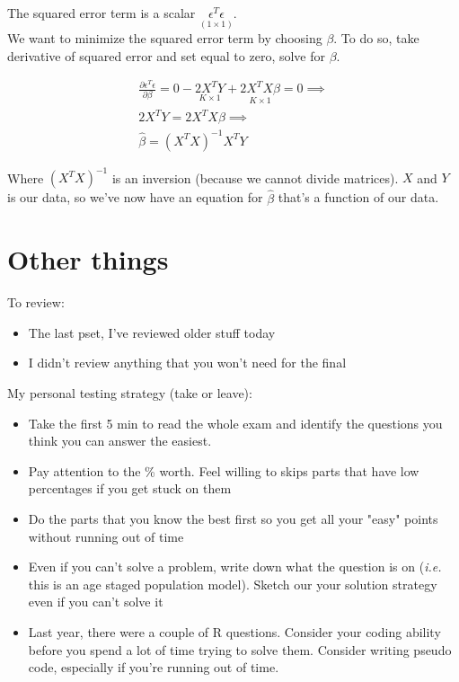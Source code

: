 \documentclass{article}
\begin{document}
The squared error term is a scalar $\underset{(1 \times 1)}{\epsilon^T \epsilon}$. \\

We want to minimize the squared error term by choosing $\beta$. To do so, take derivative of squared error and set equal to zero, solve for $\beta$. 

\begin{align}
    \frac{\partial \epsilon^T  \epsilon }{ \partial \beta} = 0 - \underset{K \times 1}{2X^T Y} + \underset{K \times 1}{2 X^T X \beta} = 0 \implies \\
    2X^T Y = 2 X^T X \beta \implies \\
    \hat \beta = {(X^T X)}^{-1} X^T Y
\end{align}

Where ${(X^T X)}^{-1}$ is an inversion (because we cannot divide matrices). $X$ and $Y$ is our data, so we've now have an equation for $\hat \beta$ that's a function of our data. 


\section{Other things}

To review: 
\begin{itemize}
    \item The last pset, I've reviewed older stuff today 
    \item I didn't review anything that you won't need for the final
\end{itemize}

My personal testing strategy (take or leave): 
\begin{itemize}
    \item Take the first 5 min to read the whole exam and identify the questions you think you can answer the easiest. 
    \item Pay attention to the \% worth. Feel willing to skips parts that have low percentages if you get stuck on them 
    \item Do the parts that you know the best first so you get all your "easy" points without running out of time
    \item Even if you can't solve  a problem, write down what the question is on (\textit{i.e.} this is an age staged population model). Sketch our your solution strategy even if you can't solve it 
    \item Last year, there were a couple of R questions. Consider your coding ability before you spend a lot of time trying to solve them. Consider writing pseudo code, especially if you're running out of time.
\end{itemize}
\end{document}
